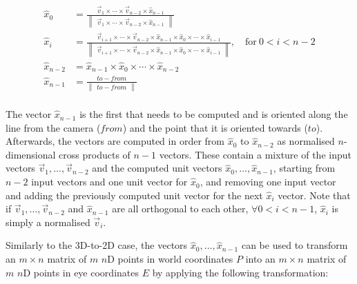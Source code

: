 \begin{align*}
\hat{x}_0 &= \frac{\overrightarrow{v}_1 \times \cdots \times \overrightarrow{v}_{n-2} \times \hat{x}_{n-1}}{\begin{Vmatrix} \overrightarrow{v}_1 \times \cdots \times \overrightarrow{v}_{n-2} \times \hat{x}_{n-1} \end{Vmatrix}} \\
\hat{x}_i &= \frac{\overrightarrow{v}_{i+1} \times \cdots \times \overrightarrow{v}_{n-2} \times \hat{x}_{n-1} \times \hat{x}_0 \times \cdots \times \hat{x}_{i-1}}{\begin{Vmatrix} \overrightarrow{v}_{i+1} \times \cdots \times \overrightarrow{v}_{n-2} \times \hat{x}_{n-1} \times \hat{x}_0 \times \cdots \times \hat{x}_{i-1} \end{Vmatrix}}, \mathrm{\quad{}for\ } 0 < i < n-2 \\
\hat{x}_{n-2} &= \hat{x}_{n-1} \times \hat{x}_0 \times \cdots \times \hat{x}_{n-2} \\
\hat{x}_{n-1} &= \frac{to - from}{\begin{Vmatrix} to - from \end{Vmatrix}} \\
\end{align*}

The vector $\hat{x}_{n-1}$ is the first that needs to be computed and is oriented along the line from the camera ($from$) and the point that it is oriented towards ($to$).
Afterwards, the vectors are computed in order from $\hat{x}_0$ to $\hat{x}_{n-2}$ as normalised $n$-dimensional cross products of $n-1$ vectors.
These contain a mixture of the input vectors $\overrightarrow{v}_1, \ldots, \overrightarrow{v}_{n-2}$ and the computed unit vectors $\hat{x}_0, \ldots, \hat{x}_{n-1}$, starting from $n-2$ input vectors and one unit vector for $\hat{x}_0$, and removing one input vector and adding the previously computed unit vector for the next $\hat{x}_i$ vector.
Note that if $\overrightarrow{v}_1, \ldots, \overrightarrow{v}_{n-2}$ and $\hat{x}_{n-1}$ are all orthogonal to each other, $\forall 0 < i < n-1$, $\hat{x}_i$ is simply a normalised $\overrightarrow{v}_i$.

Similarly to the 3D-to-2D case, the vectors $\hat{x}_0, \ldots, \hat{x}_{n-1}$ can be used to transform an $m \times n$ matrix of $m$ $n$D points in world coordinates $P$ into an $m \times n$ matrix of $m$ $n$D points in eye coordinates $E$ by applying the following transformation:

